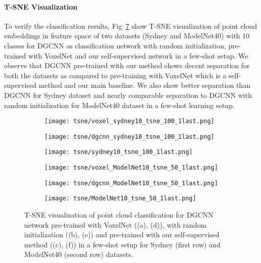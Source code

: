 \documentclass{article}
\begin{document}
\paragraph{T-SNE Visualization}
To verify the classification results, Fig~\ref{fig:tsne} show T-SNE visualization of point cloud embeddings in feature space of two datasets (Sydney and ModelNet40) with $10$ classes for DGCNN as classification network with random initialization, pre-trained with VoxelNet and our self-supervised network in a few-shot setup. We observe that DGCNN pre-trained with our method shows decent separation for both the datasets as compared to pre-training with VoxelNet which is a self-supervised method and our main baseline. We also show better separation than DGCNN for Sydney dataset and nearly comparable separation to DGCNN with random initialization for ModelNet40 dataset in a few-shot learning setup.

\begin{figure}
	\centering
	\begin{subfigure}{.32\textwidth}
		\centering
		\texttt{[image: tsne/voxel\_sydney10\_tsne\_100\_1last.png]}
		\caption{}
		\label{fig:tsne1}
	\end{subfigure}\begin{subfigure}{.32\textwidth}
		\centering
		\texttt{[image: tsne/dgcnn\_sydney10\_tsne\_100\_1last.png]}
		\caption{}
		\label{fig:tsne2}
    \end{subfigure}\begin{subfigure}{.32\textwidth}
		\centering
		\texttt{[image: tsne/sydney10\_tsne\_100\_1last.png]}
		\caption{}
		\label{fig:tsne3}
	\end{subfigure}

	\begin{subfigure}{.32\textwidth}
		\centering
		\texttt{[image: tsne/voxel\_ModelNet10\_tsne\_50\_1last.png]}
		\caption{}
		\label{fig:tsne4}
    \end{subfigure}\begin{subfigure}{.32\textwidth}
		\centering
		\texttt{[image: tsne/dgcnn\_ModelNet10\_tsne\_50\_1last.png]}
		\caption{}
		\label{fig:tsne5}
    \end{subfigure}\begin{subfigure}{.32\textwidth}
		\centering
		\texttt{[image: tsne/ModelNet10\_tsne\_50\_1last.png]}
		\caption{}
		\label{fig:tsne6}
	\end{subfigure}\caption{T-SNE visualization of point cloud classification for DGCNN network pre-trained with VoxelNet ((a), (d)), with random initialization ((b), (e)) and pre-trained with our self-supervised method ((c), (f)) in a few-shot setup for Sydney (first row) and ModelNet40 (second row) datasets. }
	\label{fig:tsne}
\end{figure}
\end{document}
